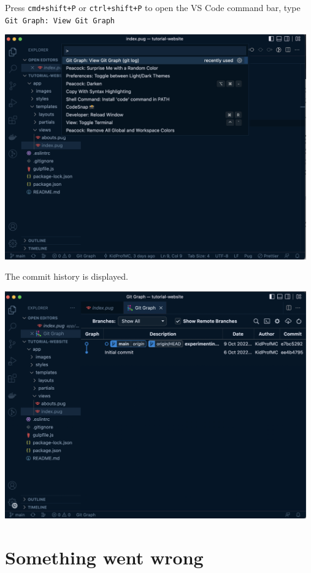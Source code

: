 Press \texttt{cmd+shift+P} or \texttt{ctrl+shift+P} to open the VS Code command bar, type \texttt{Git Graph: View Git Graph}

\begin{center}
\includegraphics[width=13cm]{images/ch3-gitgraph1.png}
\end{center}

The commit history is displayed.

\begin{center}
\includegraphics[width=13cm]{images/ch3-gitgraph2.png}
\end{center}

\section{Something went wrong} 


